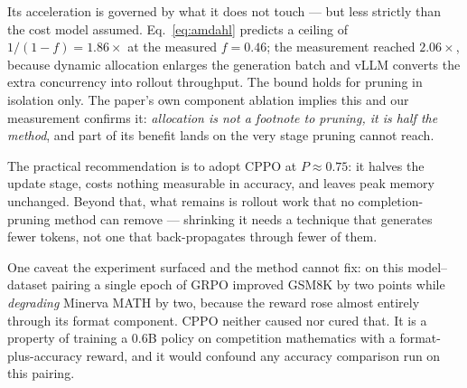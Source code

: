 \documentclass[11pt,a4paper]{article}
\begin{document}
Its acceleration is governed by what it does not touch --- but less strictly
than the cost model assumed. Eq.~\eqref{eq:amdahl} predicts a ceiling of
$1/(1-f) = 1.86\times$ at the measured $f = 0.46$; the measurement reached
$2.06\times$, because dynamic allocation enlarges the generation batch and vLLM
converts the extra concurrency into rollout throughput. The bound holds for
pruning in isolation only. The paper's own component ablation implies this and
our measurement confirms it: \emph{allocation is not a footnote to pruning, it
is half the method}, and part of its benefit lands on the very stage pruning
cannot reach.

The practical recommendation is to adopt CPPO at $P \approx 0.75$: it halves
the update stage, costs nothing measurable in accuracy, and leaves peak memory
unchanged. Beyond that, what remains is rollout work that no completion-pruning
method can remove --- shrinking it needs a technique that generates fewer
tokens, not one that back-propagates through fewer of them.

One caveat the experiment surfaced and the method cannot fix: on this
model--dataset pairing a single epoch of GRPO improved GSM8K by two points
while \emph{degrading} Minerva MATH by two, because the reward rose almost
entirely through its format component. CPPO neither caused nor cured that. It
is a property of training a $0.6$B policy on competition mathematics with a
format-plus-accuracy reward, and it would confound any accuracy comparison run
on this pairing.



\end{document}
